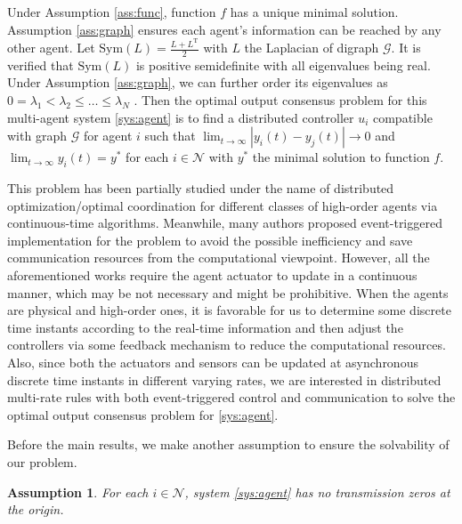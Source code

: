 \documentclass[sort&compress]{IEEEtran}
\renewcommand{\top}{{\mathrm{T}}}
\newcommand{\R}{\mathbb{R}}
\newcommand{\N}{\mathcal{N}}
\newtheorem{ass}{Assumption}
\begin{document}
Under Assumption \ref{ass:func}, function $f$ has a unique minimal solution. %
Assumption \ref{ass:graph} ensures each agent's information can be reached by any other agent. Let $\mbox{Sym}(L)=\frac{L+L^\top}{2}$ with $L$ the Laplacian of digraph $\mathcal{G}$.  It is verified that $\mbox{Sym}(L)$ is positive semidefinite with all eigenvalues being real. Under Assumption \ref{ass:graph}, we can further order its eigenvalues as $0= \lambda_1 <\lambda_2 \leq \dots\leq \lambda_N$ . %
Then the optimal output consensus problem  for this multi-agent system \eqref{sys:agent} is to find a distributed controller $u_i$ compatible with graph $\mathcal{G}$ for agent $i$ such that $\lim_{t\to \infty} |y_i(t)-y_j(t)|\to 0$  and $\lim_{t\to \infty} y_i(t)= y^*$ for each $i\in \mathcal{N}$ with $y^*$ the minimal solution to function $f$.   

This problem has been partially studied under the name of distributed optimization/optimal coordination for different classes of high-order agents via continuous-time algorithms. %
Meanwhile, many authors proposed event-triggered implementation for the problem to avoid the possible inefficiency and save communication resources from the computational viewpoint. %
However, all the aforementioned works require the agent actuator to update in a continuous manner, which may be not necessary and might be prohibitive. When the agents are physical and high-order ones, it is favorable for us to determine some discrete time instants according to the real-time information and then adjust the controllers via some feedback mechanism to reduce the computational resources. Also, since both the actuators and sensors  can be updated at asynchronous discrete time instants in different varying rates, we are interested in distributed multi-rate rules with both event-triggered control and communication to solve the optimal output consensus  problem for  \eqref{sys:agent}.   

Before the main results, we make another assumption to ensure the solvability of our problem.  
\begin{ass}\label{ass:agent}
	For each $i\in \N$, system \eqref{sys:agent} has no transmission zeros at the origin. %
\end{ass}
\end{document}
